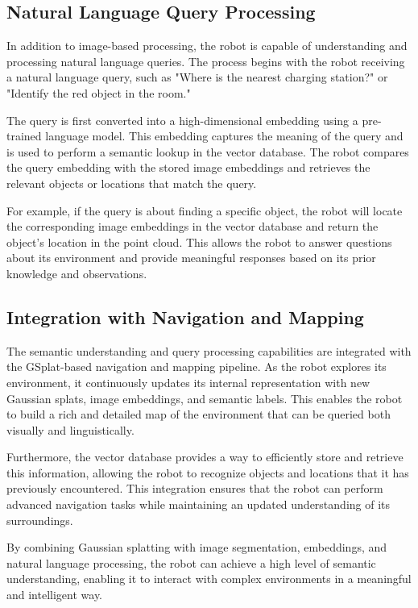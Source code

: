 \subsection{Natural Language Query Processing}

In addition to image-based processing, the robot is capable of understanding
and processing natural language queries. The process begins with the robot
receiving a natural language query, such as "Where is the nearest charging
station?" or "Identify the red object in the room."

The query is first converted into a high-dimensional embedding using a
pre-trained language model. This embedding captures the meaning of the query
and is used to perform a semantic lookup in the vector database. The robot
compares the query embedding with the stored image embeddings and retrieves the
relevant objects or locations that match the query.

For example, if the query is about finding a specific object, the robot will
locate the corresponding image embeddings in the vector database and return the
object's location in the point cloud. This allows the robot to answer questions
about its environment and provide meaningful responses based on its prior
knowledge and observations. \cite{che2024enhancingmultimodalunderstandingclipbased}

\subsection{Integration with Navigation and Mapping}

The semantic understanding and query processing capabilities are integrated
with the GSplat-based navigation and mapping pipeline. As the robot explores
its environment, it continuously updates its internal representation with new
Gaussian splats, image embeddings, and semantic labels. This enables the robot
to build a rich and detailed map of the environment that can be queried both
visually and linguistically.

Furthermore, the vector database provides a way to efficiently store and
retrieve this information, allowing the robot to recognize objects and
locations that it has previously encountered. This integration ensures that the
robot can perform advanced navigation tasks while maintaining an updated
understanding of its surroundings.

By combining Gaussian splatting with image segmentation, embeddings, and
natural language processing, the robot can achieve a high level of semantic
understanding, enabling it to interact with complex environments in a
meaningful and intelligent way.

